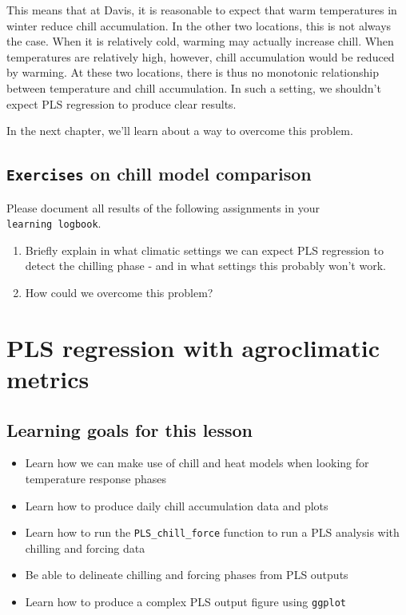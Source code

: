 \documentclass[
]{book}
\providecommand{\tightlist}{%
  \setlength{\itemsep}{0pt}\setlength{\parskip}{0pt}}
\begin{document}
This means that at Davis, it is reasonable to expect that warm temperatures in winter reduce chill accumulation. In the other two locations, this is not always the case. When it is relatively cold, warming may actually increase chill. When temperatures are relatively high, however, chill accumulation would be reduced by warming. At these two locations, there is thus no monotonic relationship between temperature and chill accumulation. In such a setting, we shouldn't expect PLS regression to produce clear results.

In the next chapter, we'll learn about a way to overcome this problem.

\hypertarget{exercises_PLS_reflection}{%
\section*{\texorpdfstring{\texttt{Exercises} on chill model comparison}{Exercises on chill model comparison}}\label{exercises_PLS_reflection}}

Please document all results of the following assignments in your \texttt{learning\ logbook}.

\begin{enumerate}
\def\labelenumi{\arabic{enumi})}
\tightlist
\item
  Briefly explain in what climatic settings we can expect PLS regression to detect the chilling phase - and in what settings this probably won't work.
\item
  How could we overcome this problem?
\end{enumerate}

\hypertarget{pls_chillforce}{%
\chapter{PLS regression with agroclimatic metrics}\label{pls_chillforce}}

\hypertarget{goals_PLS_chillforce}{%
\section*{Learning goals for this lesson}\label{goals_PLS_chillforce}}

\begin{itemize}
\tightlist
\item
  Learn how we can make use of chill and heat models when looking for temperature response phases
\item
  Learn how to produce daily chill accumulation data and plots
\item
  Learn how to run the \texttt{PLS\_chill\_force} function to run a PLS analysis with chilling and forcing data
\item
  Be able to delineate chilling and forcing phases from PLS outputs
\item
  Learn how to produce a complex PLS output figure using \texttt{ggplot}
\end{itemize}
\end{document}
